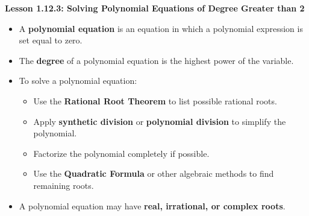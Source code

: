 \begin{center}
\textbf{Lesson 1.12.3: Solving Polynomial Equations of Degree Greater than 2}
\end{center}

\vspace*{-1.5ex}

\begin{itemize}
    \item A \textbf{polynomial equation} is an equation in which a polynomial expression is set equal to zero.
    \item The \textbf{degree} of a polynomial equation is the highest power of the variable.
    \item To solve a polynomial equation:
    \begin{itemize}
        \item Use the \textbf{Rational Root Theorem} to list possible rational roots.
        \item Apply \textbf{synthetic division} or \textbf{polynomial division} to simplify the polynomial.
        \item Factorize the polynomial completely if possible.
        \item Use the \textbf{Quadratic Formula} or other algebraic methods to find remaining roots.
    \end{itemize}
    \item A polynomial equation may have \textbf{real, irrational, or complex roots}.
\end{itemize}
